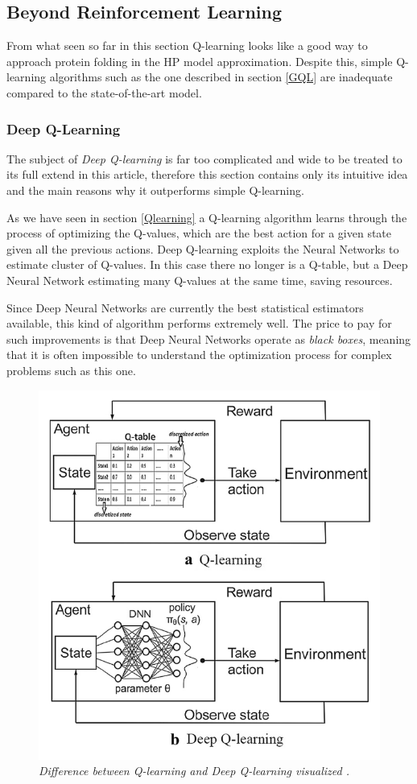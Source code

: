 \subsection{Beyond Reinforcement Learning}
From what seen so far in this section Q-learning looks like a good way to approach protein folding in the HP model approximation.
Despite this, simple Q-learning algorithms such as the one described in section \ref{GQL} are inadequate compared to the state-of-the-art model.

\subsubsection{Deep Q-Learning}
The subject of \emph{Deep Q-learning} is far too complicated and wide to be treated to its full extend in this article, therefore this section contains only its intuitive idea and the main reasons why it outperforms simple Q-learning.

As we have seen in section \ref{Qlearning} a Q-learning algorithm learns through the process of optimizing the Q-values, which are the best action for a given state given all the previous actions.
Deep Q-learning exploits the Neural Networks to estimate cluster of Q-values.
In this case there no longer is a Q-table, but a Deep Neural Network estimating many Q-values at the same time, saving resources. 

Since Deep Neural Networks are currently the best statistical estimators available, this kind of algorithm performs extremely well.
The price to pay for such improvements is that Deep Neural Networks operate as \textit{black boxes}, meaning that it is often impossible to understand the optimization process for complex problems such as this one.
\begin{figure}[H]
    \centering
    \includegraphics[width=.5\textwidth]{img/rl2.png}
    \caption{\emph{Difference between Q-learning and Deep Q-learning visualized \cite{jafari2020solving}.}}
    \label{fig:rl2}
\end{figure}